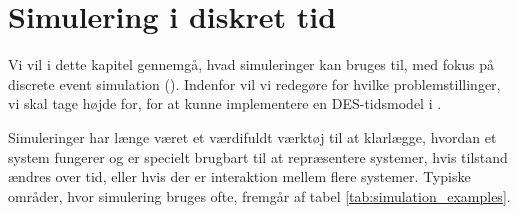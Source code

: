 \chapter{Simulering i diskret tid}
Vi vil i dette kapitel gennemgå, hvad simuleringer kan bruges til, med fokus på discrete event simulation (\des). Indenfor \des vil vi redegøre for hvilke problemstillinger, vi skal tage højde for, for at kunne implementere en DES-tidsmodel i \pycsp. 

Simuleringer har længe været et værdifuldt værktøj til at klarlægge, hvordan et system fungerer og er specielt brugbart til at repræsentere systemer, hvis 
tilstand ændres over tid, eller hvis der er interaktion mellem flere systemer. Typiske områder, hvor simulering bruges ofte, fremgår af tabel \ref{tab:simulation_examples}. 

